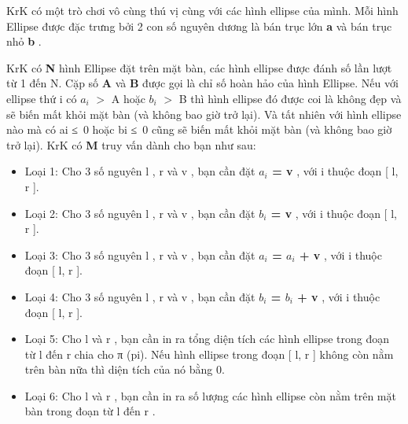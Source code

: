 KrK có một trò chơi vô cùng thú vị cùng với các hình ellipse của mình. Mỗi hình Ellipse được đặc trưng bởi 2 con số nguyên dương là bán trục lớn   \textbf{    a   }   và bán trục nhỏ   \textbf{    b   }   .  

   KrK có   \textbf{    N   }   hình Ellipse đặt trên mặt bàn, các hình ellipse được đánh số lần lượt từ 1 đến N. Cặp số   \textbf{    A   }   và   \textbf{    B   }   được gọi là chỉ số hoàn hảo của hình Ellipse. Nếu với ellipse thứ i có $a_{i}$   $>$ A hoặc $b_{i}$   $>$ B thì hình ellipse đó được coi là không đẹp và sẽ biến mất khỏi mặt bàn (và không bao giờ trở lại). Và tất nhiên với hình ellipse nào mà có ai ≤ 0 hoặc bi ≤ 0 cũng sẽ biến mất khỏi mặt bàn (và không bao giờ trở lại). KrK có   \textbf{    M   }   truy vấn dành cho bạn như sau:  


\begin{itemize}
	\item     Loại 1: Cho 3 số nguyên    l    ,    r    và    v    , bạn cần đặt    \textbf{     $a_{i}$     = v    }    , với i thuộc đoạn [    l, r    ].   
	\item     Loại 2: Cho 3 số nguyên    l    ,    r    và    v    , bạn cần đặt    \textbf{     $b_{i}$     = v    }    , với i thuộc đoạn [    l, r    ].   
	\item     Loại 3: Cho 3 số nguyên    l    ,    r    và    v    , bạn cần đặt    \textbf{     $a_{i}$     = $a_{i}$     + v    }    , với i thuộc đoạn [    l, r    ].   
	\item     Loại 4: Cho 3 số nguyên    l    ,    r    và    v    , bạn cần đặt    \textbf{     $b_{i}$     = $b_{i}$     + v    }    , với i thuộc đoạn [    l, r    ].   
	\item     Loại 5: Cho    l    và    r    , bạn cần in ra tổng diện tích các hình ellipse trong đoạn từ    l    đến    r    chia cho π (pi). Nếu hình ellipse trong đoạn [    l, r    ] không còn nằm trên bàn nữa thì diện tích của nó bằng 0.   
	\item     Loại 6: Cho    l    và    r    , bạn cần in ra số lượng các hình ellipse còn nằm trên mặt bàn trong đoạn từ    l    đến    r    .   
\end{itemize}